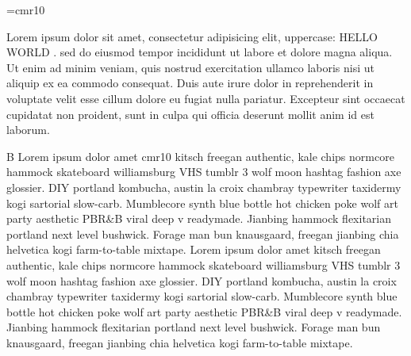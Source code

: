 \font\thefont=cmr10 \selectfont

\relax

\noindent

\indent Lorem ipsum dolor sit amet, consectetur adipisicing elit, uppercase: \uppercase{hello world} \hskip 10pt. sed do eiusmod tempor incididunt ut labore et dolore magna aliqua. Ut enim ad minim veniam, quis nostrud exercitation ullamco laboris nisi ut aliquip ex ea commodo consequat. Duis aute irure dolor in reprehenderit \ignorespaces        in voluptate velit esse cillum dolore eu fugiat nulla pariatur. Excepteur sint occaecat cupidatat non proident, sunt in culpa qui officia deserunt mollit anim id est laborum.

\ignorespaces       










\noindent B \relax Lorem ipsum \indent dolor \noindent amet \font\thefont cmr10 \selectfont kitsch freegan  authentic, kale chips normcore hammock skateboard williamsburg VHS tumblr 3 wolf moon hashtag fashion axe glossier. DIY portland kombucha, austin la croix chambray typewriter taxidermy kogi sartorial slow-carb. Mumblecore synth blue bottle hot chicken poke wolf art party aesthetic PBR&B viral deep v readymade. Jianbing hammock flexitarian portland next level bushwick. Forage man bun knausgaard, freegan jianbing chia helvetica kogi farm-to-table mixtape. Lorem ipsum dolor amet kitsch freegan authentic, kale chips normcore hammock skateboard williamsburg VHS tumblr 3 wolf moon hashtag fashion axe glossier. DIY portland kombucha, austin la croix chambray typewriter taxidermy kogi sartorial slow-carb. Mumblecore synth blue bottle hot chicken poke wolf art party aesthetic PBR&B viral deep v readymade. Jianbing hammock flexitarian portland next level bushwick. Forage man bun knausgaard, freegan jianbing chia helvetica kogi farm-to-table mixtape.

